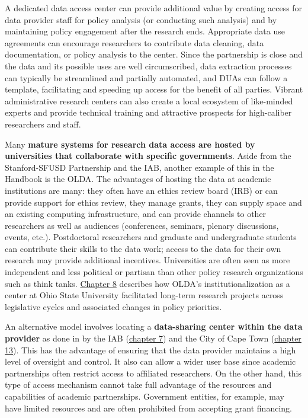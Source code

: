 A dedicated data access center can provide additional value by creating access for data provider staff for policy analysis (or conducting such analysis) and by maintaining policy engagement after the research ends. Appropriate data use agreements can encourage researchers to contribute data cleaning, data documentation, or policy analysis to the center. Since the partnership is close and the data and its possible uses are well circumscribed, data extraction processes can typically be streamlined and partially automated, and DUAs can follow a template, facilitating and speeding up access for the benefit of all parties. Vibrant administrative research centers can also create a local ecosystem of like-minded experts and provide technical training and attractive prospects for high-caliber researchers and staff.

Many \textbf{mature systems for research data access are hosted by universities that collaborate with specific governments}. Aside from the Stanford-SFUSD Partnership and the IAB, another example of this in the Handbook is the OLDA. The advantages of hosting the data at academic institutions are many: they often have an ethics review board (IRB) or can provide support for ethics review, they manage grants, they can supply space and an existing computing infrastructure, and can provide channels to other researchers as well as audiences (conferences, seminars, plenary discussions, events, etc.). Postdoctoral researchers and graduate and undergraduate students can contribute their skills to the data work; access to the data for their own research may provide additional incentives. Universities are often seen as more independent and less political or partisan than other policy research organizations such as think tanks. \protect\hyperlink{olda}{Chapter 8} describes how OLDA's institutionalization as a center at Ohio State University facilitated long-term research projects across legislative cycles and associated changes in policy priorities.

An alternative model involves locating a \textbf{data-sharing center within the data provider} as done in by the IAB (\protect\hyperlink{iab}{chapter 7}) and the City of Cape Town (\protect\hyperlink{cct}{chapter 13}). This has the advantage of ensuring that the data provider maintains a high level of oversight and control. It also can allow a wider user base since academic partnerships often restrict access to affiliated researchers. On the other hand, this type of access mechanism cannot take full advantage of the resources and capabilities of academic partnerships. Government entities, for example, may have limited resources and are often prohibited from accepting grant financing.

